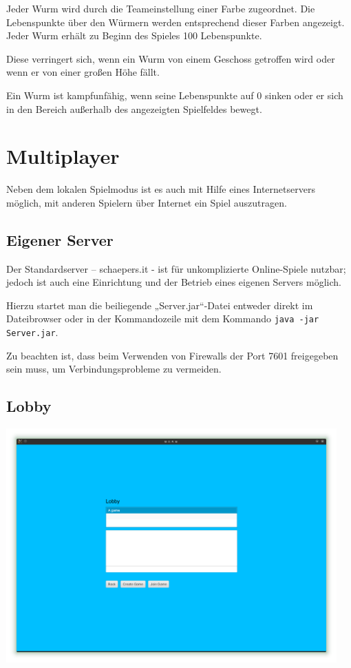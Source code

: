 \documentclass{scrreprt}
\begin{document}
Jeder Wurm wird durch die Teameinstellung einer Farbe zugeordnet. Die Lebenspunkte über den Würmern werden entsprechend dieser Farben angezeigt.
Jeder Wurm erhält zu Beginn des Spieles 100 Lebenspunkte.

Diese verringert sich, wenn ein Wurm von einem Geschoss getroffen wird oder wenn er von einer großen Höhe fällt.

Ein Wurm ist kampfunfähig, wenn seine Lebenspunkte auf 0 sinken oder er sich in den Bereich außerhalb des angezeigten Spielfeldes bewegt.

\chapter{Multiplayer}

Neben dem lokalen Spielmodus ist es auch mit Hilfe eines Internetservers möglich, mit anderen Spielern über Internet ein Spiel auszutragen.

\section{Eigener Server}

Der Standardserver – schaepers.it - ist für unkomplizierte Online-Spiele nutzbar; jedoch ist auch eine Einrichtung und der Betrieb eines eigenen Servers möglich.

Hierzu startet man die beiliegende „Server.jar“-Datei entweder direkt im Dateibrowser oder in der Kommandozeile mit dem Kommando
\texttt{java -jar Server.jar}.

Zu beachten ist, dass beim Verwenden von Firewalls der  Port 7601 freigegeben sein muss, um Verbindungsprobleme zu vermeiden.

\section{Lobby}

\includegraphics[height=9cm]{Screenshot8.png}
\end{document}
